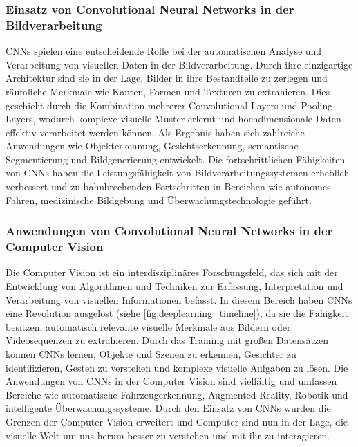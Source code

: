         \subsubsection{Einsatz von Convolutional Neural Networks in der Bildverarbeitung}
    
            \acfp{CNN} spielen eine entscheidende Rolle bei der automatischen Analyse und Verarbeitung von visuellen Daten in der Bildverarbeitung. 
            Durch ihre einzigartige Architektur sind sie in der Lage, Bilder in ihre Bestandteile zu zerlegen und räumliche Merkmale wie Kanten, Formen und Texturen zu extrahieren. 
            Dies geschieht durch die Kombination mehrerer Convolutional Layers und Pooling Layers, wodurch komplexe visuelle Muster erlernt und hochdimensionale Daten effektiv verarbeitet werden können. Als Ergebnis haben sich zahlreiche Anwendungen wie Objekterkennung, Gesichtserkennung, semantische Segmentierung und Bildgenerierung entwickelt. 
            Die fortschrittlichen Fähigkeiten von CNNs haben die Leistungsfähigkeit von Bildverarbeitungssystemen erheblich verbessert und zu bahnbrechenden Fortschritten in Bereichen wie autonomes Fahren, medizinische Bildgebung und Überwachungstechnologie geführt.
        
        \subsubsection{Anwendungen von Convolutional Neural Networks in der Computer Vision}
        
            Die Computer Vision ist ein interdisziplinäres Forschungsfeld, das sich mit der Entwicklung von Algorithmen und Techniken zur Erfassung, Interpretation und Verarbeitung von visuellen Informationen befasst. 
            In diesem Bereich haben \acfp{CNN} eine Revolution ausgelöst (siehe \ref{fig:deeplearning_timeline}), da sie die Fähigkeit besitzen, automatisch relevante visuelle Merkmale aus Bildern oder Videosequenzen zu extrahieren. 
            Durch das Training mit großen Datensätzen können \acp{CNN} lernen, Objekte und Szenen zu erkennen, Gesichter zu identifizieren, Gesten zu verstehen und komplexe visuelle Aufgaben zu lösen. 
            Die Anwendungen von \acp{CNN} in der Computer Vision sind vielfältig und umfassen Bereiche wie automatische Fahrzeugerkennung, Augmented Reality, Robotik und intelligente Überwachungssysteme. 
            Durch den Einsatz von \acp{CNN} wurden die Grenzen der Computer Vision erweitert und Computer sind nun in der Lage, die visuelle Welt um uns herum besser zu verstehen und mit ihr zu interagieren.
        

